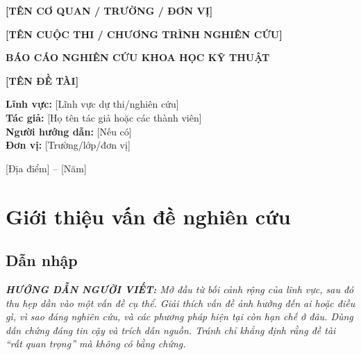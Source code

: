 \documentclass[12pt,a4paper]{report}
\newcommand{\huongdan}[1]{%
  \par\smallskip\noindent
  \textit{\textbf{HƯỚNG DẪN NGƯỜI VIẾT:} #1}%
  \par\smallskip}
\begin{document}
\begin{titlepage}
  \centering
  {\large \textbf{[TÊN CƠ QUAN / TRƯỜNG / ĐƠN VỊ]}\par}
  \vspace{1.5cm}
  {\large \textbf{[TÊN CUỘC THI / CHƯƠNG TRÌNH NGHIÊN CỨU]}\par}
  \vspace{2.2cm}
  {\Large\bfseries BÁO CÁO NGHIÊN CỨU KHOA HỌC KỸ THUẬT\par}
  \vspace{1cm}
  {\huge\bfseries [TÊN ĐỀ TÀI]\par}
  \vspace{1.5cm}
  \begin{flushleft}
    \textbf{Lĩnh vực:} [Lĩnh vực dự thi/nghiên cứu]\\[0.4cm]
    \textbf{Tác giả:} [Họ tên tác giả hoặc các thành viên]\\[0.4cm]
    \textbf{Người hướng dẫn:} [Nếu có]\\[0.4cm]
    \textbf{Đơn vị:} [Trường/lớp/đơn vị]
  \end{flushleft}
  \vfill
  {\large [Địa điểm] -- [Năm]\par}
\end{titlepage}

\tableofcontents
\clearpage
{}

\chapter{Giới thiệu vấn đề nghiên cứu}

\section{Dẫn nhập}

\huongdan{Mở đầu từ bối cảnh rộng của lĩnh vực, sau đó thu hẹp dần
vào một vấn đề cụ thể. Giải thích vấn đề ảnh hưởng đến ai hoặc điều gì,
vì sao đáng nghiên cứu, và các phương pháp hiện tại còn hạn chế ở đâu.
Dùng dẫn chứng đáng tin cậy và trích dẫn nguồn. Tránh chỉ khẳng định
rằng đề tài ``rất quan trọng'' mà không có bằng chứng.}
\end{document}
